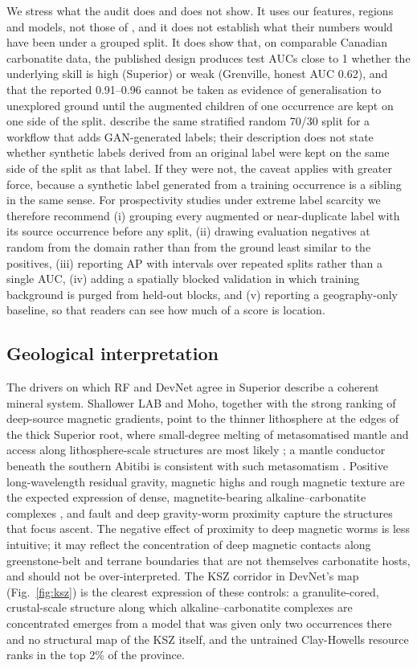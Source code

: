 \documentclass[pdflatex,sn-apa]{sn-jnl}
\begin{document}
We stress what the audit does and does not show. It uses our features, regions and models, not those of \citet{Parsa2024}, and it does not establish what their numbers would have been under a grouped split. It does show that, on comparable Canadian carbonatite data, the published design produces test AUCs close to 1 whether the underlying skill is high (Superior) or weak (Grenville, honest AUC 0.62), and that the reported 0.91--0.96 cannot be taken as evidence of generalisation to unexplored ground until the augmented children of one occurrence are kept on one side of the split. \citet{Parsa2025} describe the same stratified random 70/30 split for a workflow that adds GAN-generated labels; their description does not state whether synthetic labels derived from an original label were kept on the same side of the split as that label. If they were not, the caveat applies with greater force, because a synthetic label generated from a training occurrence is a sibling in the same sense. For prospectivity studies under extreme label scarcity we therefore recommend (i) grouping every augmented or near-duplicate label with its source occurrence before any split, (ii) drawing evaluation negatives at random from the domain rather than from the ground least similar to the positives, (iii) reporting AP with intervals over repeated splits rather than a single AUC, (iv) adding a spatially blocked validation in which training background is purged from held-out blocks, and (v) reporting a geography-only baseline, so that readers can see how much of a score is location.

\subsection{Geological interpretation}\label{sec:disc-geology}

The drivers on which RF and DevNet agree in Superior describe a coherent mineral system. Shallower LAB and Moho, together with the strong ranking of deep-source magnetic gradients, point to the thinner lithosphere at the edges of the thick Superior root, where small-degree melting of metasomatised mantle and access along lithosphere-scale structures are most likely \citep{Griffin2013,Groves2021,Hoggard2020}; a mantle conductor beneath the southern Abitibi is consistent with such metasomatism \citep{Snyder2021}. Positive long-wavelength residual gravity, magnetic highs and rough magnetic texture are the expected expression of dense, magnetite-bearing alkaline--carbonatite complexes \citep{Thomas2016}, and fault and deep gravity-worm proximity capture the structures that focus ascent. The negative effect of proximity to deep magnetic worms is less intuitive; it may reflect the concentration of deep magnetic contacts along greenstone-belt and terrane boundaries that are not themselves carbonatite hosts, and should not be over-interpreted. The KSZ corridor in DevNet's map (Fig.~\ref{fig:ksz}) is the clearest expression of these controls: a granulite-cored, crustal-scale structure along which alkaline--carbonatite complexes are concentrated \citep{Percival1994,Gittins1967} emerges from a model that was given only two occurrences there and no structural map of the KSZ itself, and the untrained Clay-Howells resource ranks in the top 2\% of the province.
\end{document}
